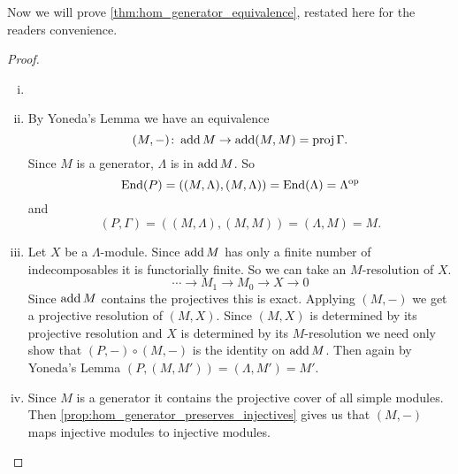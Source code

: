 Now we will prove \cref{thm:hom_generator_equivalence}, restated here for the readers convenience.
\Wederburnequivalence*
\begin{proof}
	\begin{enumerate}[i)]
		\item[]
		\item By Yoneda's Lemma we have an equivalence $$(M,-)\colon\operatorname{add} M \to \operatorname{add} (M,M)=\operatorname{proj}\Gamma.$$ Since $M$ is a generator, $\Lambda$ is in $\operatorname{add} M$. So $$\operatorname{End}(P)=((M,\Lambda), (M,\Lambda)) = \operatorname{End}(\Lambda)=\Lambda^{\operatorname{op}}$$ {\centering and} $$(P,\Gamma)=((M,\Lambda),(M,M))=(\Lambda,M)=M.$$
		\item Let $X$ be a $\Lambda$-module. Since $\operatorname{add} M$ has only a finite number of indecomposables it is functorially finite. So we can take an $M$-resolution of $X$.
		$$\cdots \to M_1 \to M_0 \to X \to 0$$
		Since $\operatorname{add} M$ contains the projectives this is exact. Applying $(M,-)$ we get a projective resolution of $(M,X)$. Since $(M, X)$ is determined by its projective resolution and $X$ is determined by its $M$-resolution we need only show that $(P,-)\circ (M,-)$ is the identity on $\operatorname{add} M$. Then again by Yoneda's Lemma $(P, (M, M')) = (\Lambda, M')=M'$.
		\item Since $M$ is a generator it contains the projective cover of all simple modules. Then \cref{prop:hom_generator_preserves_injectives} gives us that $(M, -)$ maps injective modules to injective modules.
	\end{enumerate}
\end{proof}

